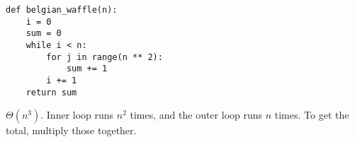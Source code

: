 \begin{blocksection}
\question \begin{lstlisting}
def belgian_waffle(n):
    i = 0
    sum = 0
    while i < n:
        for j in range(n ** 2):
            sum += 1
        i += 1
    return sum
\end{lstlisting}

\begin{solution}
$\Theta(n^3)$. Inner loop runs $n^2$ times, and the outer loop runs $n$ times. To get the total, multiply those together.
\end{solution}
\end{blocksection}

